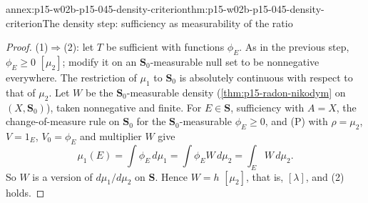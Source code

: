 \begin{annexitem}{annex:p15-w02b-p15-045-density-criterion}{thm:p15-w02b-p15-045-density-criterion}{The density step: sufficiency as measurability of the ratio}
\begin{proof}
(1)\(\Rightarrow\)(2): let \(T\) be sufficient with functions
\(\phi_E\). As in the previous step, \(\phi_E\geq0\)
\([\mu_2]\); modify it on an \(\mathbf S_0\)-measurable null set to be
nonnegative everywhere. The restriction of \(\mu_1\) to \(\mathbf S_0\)
is absolutely continuous with respect to that of \(\mu_2\). Let \(W\) be
the \(\mathbf S_0\)-measurable density
(\cref{thm:p15-radon-nikodym} on \((X,\mathbf S_0)\)), taken
nonnegative and finite. For \(E\in\mathbf S\), sufficiency with
\(A=X\), the change-of-measure rule on \(\mathbf S_0\) for the
\(\mathbf S_0\)-measurable \(\phi_E\geq0\), and (P) with \(\rho=\mu_2\),
\(V=1_E\), \(V_0=\phi_E\) and multiplier \(W\) give
\[
  \mu_1(E)=\int\phi_E\,d\mu_1=\int\phi_EW\,d\mu_2=\int_EW\,d\mu_2 .
\]
So \(W\) is a version of \(d\mu_1/d\mu_2\) on \(\mathbf S\). Hence
\(W=h\) \([\mu_2]\), that is, \([\lambda]\), and (2) holds.
\end{proof}
\end{annexitem}

